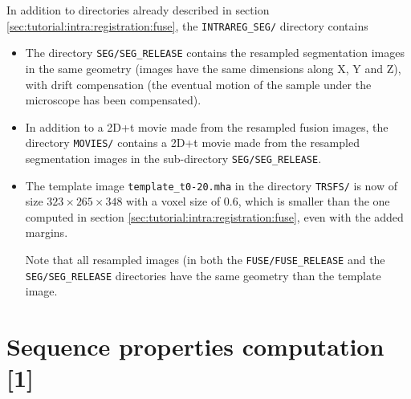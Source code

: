 \mbox{}
\mbox{}

In addition to directories already described in section
\ref{sec:tutorial:intra:registration:fuse}, the \texttt{INTRAREG\_SEG/} directory contains
\begin{itemize}
\itemsep -0.5ex
\item The directory \texttt{SEG/SEG\_RELEASE} contains the resampled segmentation images
  in the same geometry (images have the same dimensions along X, Y and
  Z), with drift compensation (the eventual motion of the sample under the
  microscope has been compensated). 
\item In addition to a 2D+t movie made from the resampled fusion
  images, the directory \texttt{MOVIES/} contains a 2D+t movie made from the resampled segmentation
  images in the sub-directory \texttt{SEG/SEG\_RELEASE}.
\item The template image \texttt{template\_t0-20.mha} in the directory
  \texttt{TRSFS/} 
  is now of size $323 \times 265 \times 348$ with a voxel size of 0.6,
  which is smaller than the one computed in section
  \ref{sec:tutorial:intra:registration:fuse}, even with the added
  margins.
  
  Note that all resampled images (in both the \texttt{FUSE/FUSE\_RELEASE} and the
  \texttt{SEG/SEG\_RELEASE} directories have the same geometry than the template
  image. 
\end{itemize}



\section{Sequence properties computation [1]}
\label{sec:tutorial:properties:seg}

